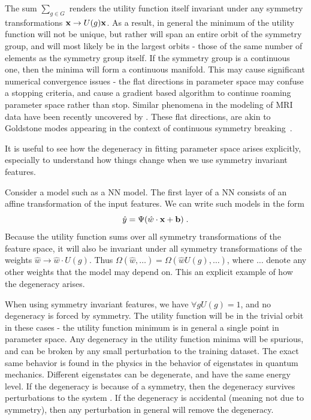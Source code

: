 \documentclass[onecolumn, nofootinbib, aps, pra, 11pt]{revtex4-1}
\begin{document}
The sum $\sum_{g \in G}$ renders the utility function itself invariant under any symmetry transformations ${\bf x} \rightarrow U(g) {\bf x}$. As a result, in general the minimum of the utility function will not be unique, but rather will span an entire orbit of the symmetry group, and will most likely be in the largest orbits - those of the same number of elements as the symmetry group itself. If the symmetry group is a continuous one, then the minima will form a continuous manifold. This may cause significant numerical convergence issues - the flat directions in parameter space may confuse a stopping criteria, and cause a gradient based algorithm to continue roaming parameter space rather than stop. Similar phenomena in the modeling of MRI data have been recently uncovered by \citet{novikov2018rotationally}. These flat directions, are akin to Goldstone modes appearing in the context of continuous symmetry breaking~\citep{nambu1960quasi, goldstone1961field, goldstone1962broken}.

It is useful to see how the degeneracy in fitting parameter space arises explicitly, especially to understand how things change when we use symmetry invariant features.

Consider a model such as a NN model. The first layer of a NN consists of an affine transformation of the input features. We can write such models in the form
\begin{equation}
{\hat y} = \Psi( {\hat w} \cdot {\bf x} + {\bf b})
\; .
\end{equation}
Because the utility function sums over all symmetry transformations of the feature space, it will also be invariant under all symmetry transformations of the weights ${\hat w} \rightarrow {\hat w} \cdot U(g)$. Thus $\Omega({\hat w}, \ldots) = \Omega({\hat w} U(g), \ldots)$, where $\ldots$ denote any other weights that the model may depend on. This an explicit example of how the degeneracy arises. 

When using symmetry invariant features, we have $\forall g U(g) = 1$, and no degeneracy is forced by symmetry. The utility function will be in the trivial orbit in these cases - the utility function minimum is in general a single point in parameter space. Any degeneracy in the utility function minima will be spurious, and can be broken by any small perturbation to the training dataset. The exact same behavior is found in the physics in the behavior of eigenstates in quantum mechanics. Different eigenstates can be degenerate, and have the same energy level. If the degeneracy is because of a symmetry, then the degeneracy survives perturbations to the system . If the degeneracy is accidental (meaning not due to symmetry), then any perturbation in general will remove the degeneracy.
\end{document}
